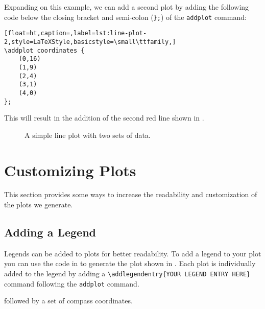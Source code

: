		Expanding on this example, we can add a second plot by adding the following code below the closing bracket and semi-colon (\texttt{\};}) of the \texttt{addplot} command:
		\begin{lstlisting}[float=ht,caption=,label=lst:line-plot-2,style=LaTeXStyle,basicstyle=\small\ttfamily,]
\addplot coordinates {
	(0,16)
	(1,9)
	(2,4)
	(3,1)
	(4,0)
};
		\end{lstlisting}
		This will result in the addition of the second red line shown in .
		\begin{figure}[H]
				\centering
				\caption{A simple line plot with two sets of data.}
				\label{fig:line-plot-2}
			\end{figure}

	\section{Customizing Plots}
		This section provides some ways to increase the readability and customization of the plots we generate.
		\subsection{Adding a Legend}
			Legends can be added to plots for better readability.
			To add a legend to your plot you can use the code in  to generate the plot shown in .
			Each plot is individually added to the legend by adding a \lstinline|\addlegendentry{YOUR LEGEND ENTRY HERE}| command following the \texttt{addplot} command.
			
			 followed by a set of compass coordinates.
			
